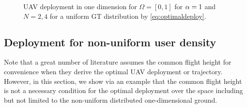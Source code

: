 \documentclass[smallabstract,smallcaptions]{dccpaper}
\newcounter{example}[section]
\newcommand{\junstart}{\color{black}}
\begin{document}
% 
\begin{figure}
    \centering
    \def\svgwidth{.9\textwidth} \scriptsize{
      }
      \caption{UAV deployment in one dimension for $\Omega=[0,1]$ for $\alpha=1$ and $N=2,4$ for a uniform GT distribution
      by \eqref{eq:optimaldeploy}.}
      \label{fig:uavonedim}
\end{figure}
%


\junstart
\subsection{Deployment for non-uniform user density}
%
Note that a great number of literature assumes the common flight height for convenience when they derive the optimal UAV
deployment or trajectory.  However, in this section, we show via an example that the common flight height is not a
necessary condition for the optimal deployment over the space including but not limited to the non-uniform distributed
one-dimensional ground.
\end{document}
